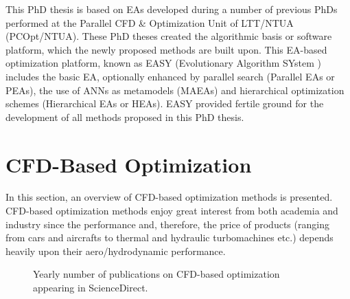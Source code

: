 This PhD thesis is based on EAs developed during a number of previous PhDs \cite{phd_Giotis,phd_Karakasis,phd_Kampolis,phd_Vera} performed at the Parallel CFD \& Optimization Unit of LTT/NTUA (PCOpt/NTUA). These PhD theses created the algorithmic basis or software platform,  which the newly proposed methods are built upon. This EA-based optimization platform, known as EASY (Evolutionary Algorithm SYstem \cite{EASYsite}) includes the basic EA, optionally enhanced by parallel search (Parallel EAs or PEAs), the use of ANNs as metamodels (MAEAs) and hierarchical optimization schemes (Hierarchical EAs or HEAs). EASY provided fertile ground for the development of all methods proposed in this PhD thesis.                       
 
 
\section{CFD-Based Optimization}

In this section, an overview of CFD-based optimization methods is presented. CFD-based optimization methods enjoy great interest from both academia and industry since the performance and, therefore, the price of products (ranging from cars and aircrafts to thermal and hydraulic turbomachines etc.) depends heavily upon their aero/hydrodynamic performance. 

\begin{figure}[h!]
\begin{minipage}[b]{1\linewidth}
 \centering
\end{minipage}
\caption{Yearly number of publications on CFD-based optimization appearing in ScienceDirect.} 
\label{pubs.CFD}
\end{figure}

